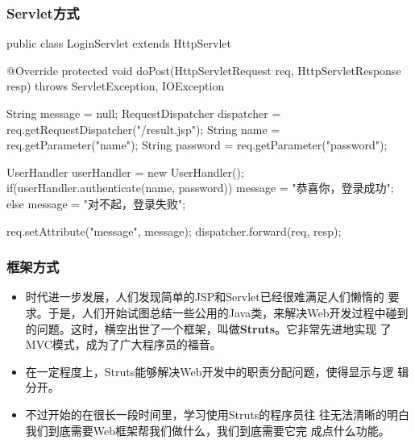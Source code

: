 \begin{frame}[fragile] %
\frametitle{Servlet方式}

\begin{javaCode}
public class LoginServlet extends HttpServlet {
  
  @Override
  protected void doPost(HttpServletRequest req, HttpServletResponse resp) 
  throws ServletException, IOException {
    String message = null;
    RequestDispatcher dispatcher = req.getRequestDispatcher("/result.jsp");
    String name = req.getParameter("name");
    String password = req.getParameter("password");
    
    UserHandler userHandler = new UserHandler();
    if(userHandler.authenticate(name, password)) {
      message = "恭喜你，登录成功";
    } else {
      message = "对不起，登录失败";
    }
    
    req.setAttribute("message", message);
    dispatcher.forward(req, resp);
  }
}
\end{javaCode}
\end{frame}

\begin{frame}[fragile] %
  \frametitle{框架方式}

  \begin{itemize}
  \item 时代进一步发展，人们发现简单的JSP和Servlet已经很难满足人们懒惰的
    要求。于是，人们开始试图总结一些公用的Java类，来解决Web开发过程中碰到
    的问题。这时，横空出世了一个框架，叫做{\bf\Red Struts}。它非常先进地实现
    了{\hei\Red MVC模式}，成为了广大程序员的福音。
  \item 在一定程度上，Struts能够解决Web开发中的职责分配问题，使得显示与逻
    辑分开。
  \item {\Blue\kai 不过开始的在很长一段时间里，学习使用Struts的程序员往
      往无法清晰的明白我们到底需要Web框架帮我们做什么，我们到底需要它完
      成点什么功能。}
  \end{itemize}
\end{frame}

